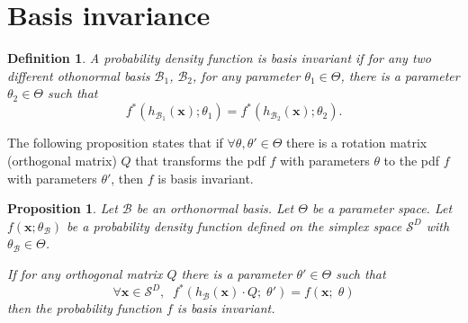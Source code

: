 \documentclass[10pt, a4paper]{article}
\newtheorem{prop}{Proposition}
\newtheorem{definition}{Definition}
\begin{document}
\newpage
\appendix
\section{Basis invariance}

\begin{definition}
A probability density function is \emph{basis invariant} if for any two different othonormal basis $\mathcal{B}_1$, $\mathcal{B}_2$, for any parameter $\theta_1 \in \Theta$, there is a parameter $\theta_2 \in \Theta$ such that
\[
f^*(h_{\mathcal{B}_1}(\textbf{x}); \theta_1) = f^*(h_{\mathcal{B}_2}(\textbf{x}); \theta_2).
\]

\end{definition}

The following proposition states that if $\forall \theta, \theta' \in \Theta$ there is a rotation matrix (orthogonal matrix) $Q$ that transforms the pdf $f$ with parameters $\theta$ to the pdf $f$ with parameters $\theta'$, then $f$ is basis invariant.

\begin{prop}
Let $\mathcal{B}$ be an orthonormal basis. Let  $\Theta$ be a parameter space. Let $f(\textbf{x} ; \theta_{\mathcal{B}})$ be a probability density function defined on the simplex space $\mathcal{S}^D$ with $\theta_{\mathcal{B}} \in \Theta$.

If for any orthogonal matrix $Q$ there is a parameter $\theta' \in \Theta$ such that 
\[
\forall \textbf{x} \in \mathcal{S}^D, \;\; f^*(h_\mathcal{B}(\textbf{x}) \cdot Q ;\; \theta') = f(\textbf{x};\; \theta) 
\]
then the probability function $f$ is basis invariant.
\end{prop}
\end{document}
